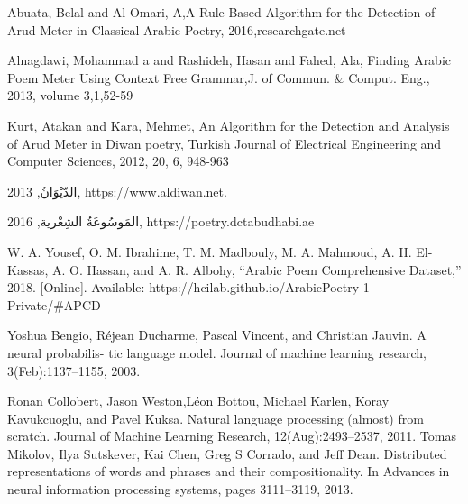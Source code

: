 \begin{thebibliography}{999}
Abuata, Belal and Al-Omari‏, A,A Rule-Based Algorithm for the Detection of Arud Meter in Classical Arabic Poetry, 2016‏,researchgate.net‏

 Alnagdawi, Mohammad a and Rashideh, Hasan and Fahed, Ala, Finding Arabic Poem Meter Using Context Free Grammar,J. of Commun. {\&} Comput. Eng., 2013, volume  3,1,52-59

 Kurt, Atakan and Kara, Mehmet, An Algorithm for the Detection and Analysis of Arud Meter in Diwan poetry, Turkish Journal of Electrical Engineering and Computer Sciences, 2012, 20, 6, 948-963




 \textarabic{الدّيْوَانُ}, 2013, https://www.aldiwan.net.

\textarabic{المَوسُوعَةُ الشِعْرية}, 2016, https://poetry.dctabudhabi.ae

 W. A. Yousef, O. M. Ibrahime, T. M. Madbouly, M. A. Mahmoud, A. H. El-Kassas, A. O. Hassan, and A. R. Albohy, “Arabic Poem Comprehensive Dataset,” 2018. [Online]. Available: https://hcilab.github.io/ArabicPoetry-1-Private/\#APCD

    Yoshua Bengio, Réjean Ducharme,
Pascal Vincent, and Christian Jauvin. A neural probabilis-
tic language model. Journal of machine learning research,
3(Feb):1137–1155, 2003.

 Ronan Collobert, Jason Weston,Léon Bottou, Michael Karlen, Koray Kavukcuoglu, and Pavel Kuksa. Natural language processing (almost) from scratch. Journal of Machine Learning Research, 12(Aug):2493–2537, 2011.
 Tomas Mikolov, Ilya Sutskever, Kai Chen, Greg S Corrado, and Jeff Dean. Distributed representations of words and phrases and their compositionality. In Advances in neural information processing systems, pages 3111–3119, 2013.


\end{thebibliography}
